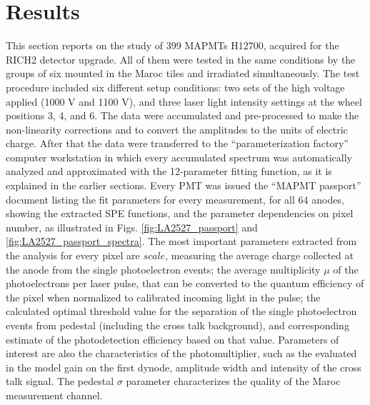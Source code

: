 \section{Results}

This section reports on the study of 399 MAPMTs H12700, acquired for the RICH2 detector upgrade. All of them were tested in the same conditions by the groups of six mounted in the Maroc tiles and irradiated simultaneously. The test procedure included six different setup conditions: two sets of the high voltage applied (1000 V and 1100 V), and three laser light intensity settings at the wheel positions 3, 4, and 6. The data were accumulated and pre-processed to make the non-linearity corrections and to convert the amplitudes to the units of electric charge. After that the data were transferred to the ``parameterization factory'' computer workstation in which every accumulated spectrum was automatically analyzed and approximated with the 12-parameter fitting function, as it is explained in the earlier sections. Every PMT was issued the ``MAPMT passport'' document listing the fit parameters for every measurement, for all 64 anodes, showing the extracted SPE functions, and the parameter dependencies on pixel number, as illustrated in Figs. \ref{fig:LA2527_passport} and \ref{fig:LA2527_passport_spectra}. The most important parameters extracted from the analysis for every pixel are $scale$, measuring the average charge collected at the anode from the single photoelectron events; the average multiplicity $\mu$ of the photoelectrons per laser pulse, that can be converted to the quantum efficiency of the pixel when normalized to calibrated incoming light in the pulse; the calculated optimal threshold value for the separation of the single photoelectron events from pedestal (including the cross talk background), and corresponding estimate of the photodetection efficiency based on that value. Parameters of interest are also the characteristics of the photomultiplier, such as the evaluated in the model gain on the first dynode, amplitude width and intensity of the cross talk signal. The pedestal $\sigma$ parameter characterizes the quality of the Maroc measurement channel.

